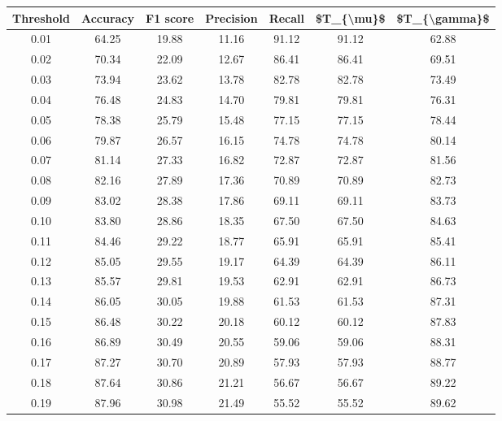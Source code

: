 \begin{tabular}{|c|c|c|c|c|c|c|}
\hline
 Threshold &  Accuracy &  F1 score &  Precision &  Recall &  \$T\_\{\textbackslash mu\}\$ &  \$T\_\{\textbackslash gamma\}\$ \\
\hline
      0.01 &     64.25 &     19.88 &      11.16 &   91.12 &      91.12 &         62.88 \\
      0.02 &     70.34 &     22.09 &      12.67 &   86.41 &      86.41 &         69.51 \\
      0.03 &     73.94 &     23.62 &      13.78 &   82.78 &      82.78 &         73.49 \\
      0.04 &     76.48 &     24.83 &      14.70 &   79.81 &      79.81 &         76.31 \\
      0.05 &     78.38 &     25.79 &      15.48 &   77.15 &      77.15 &         78.44 \\
      0.06 &     79.87 &     26.57 &      16.15 &   74.78 &      74.78 &         80.14 \\
      0.07 &     81.14 &     27.33 &      16.82 &   72.87 &      72.87 &         81.56 \\
      0.08 &     82.16 &     27.89 &      17.36 &   70.89 &      70.89 &         82.73 \\
      0.09 &     83.02 &     28.38 &      17.86 &   69.11 &      69.11 &         83.73 \\
      0.10 &     83.80 &     28.86 &      18.35 &   67.50 &      67.50 &         84.63 \\
      0.11 &     84.46 &     29.22 &      18.77 &   65.91 &      65.91 &         85.41 \\
      0.12 &     85.05 &     29.55 &      19.17 &   64.39 &      64.39 &         86.11 \\
      0.13 &     85.57 &     29.81 &      19.53 &   62.91 &      62.91 &         86.73 \\
      0.14 &     86.05 &     30.05 &      19.88 &   61.53 &      61.53 &         87.31 \\
      0.15 &     86.48 &     30.22 &      20.18 &   60.12 &      60.12 &         87.83 \\
      0.16 &     86.89 &     30.49 &      20.55 &   59.06 &      59.06 &         88.31 \\
      0.17 &     87.27 &     30.70 &      20.89 &   57.93 &      57.93 &         88.77 \\
      0.18 &     87.64 &     30.86 &      21.21 &   56.67 &      56.67 &         89.22 \\
      0.19 &     87.96 &     30.98 &      21.49 &   55.52 &      55.52 &         89.62 \\

\end{tabular}
